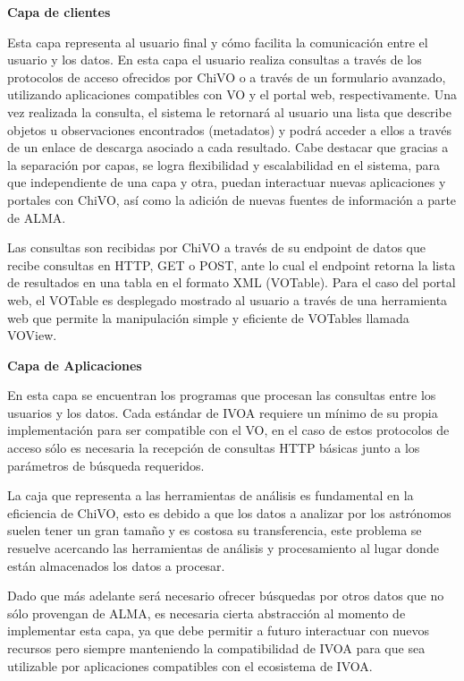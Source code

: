 \textbf{Capa de clientes}

Esta capa representa al usuario final y cómo facilita la comunicación entre el
usuario y los datos.
En esta capa el usuario realiza consultas a través de los protocolos de acceso
ofrecidos por ChiVO o a través de un formulario avanzado, utilizando aplicaciones
compatibles con VO y el portal web, respectivamente.
Una vez realizada la consulta, el sistema le retornará al usuario una lista que
describe objetos u observaciones encontrados (metadatos) y podrá acceder a ellos a
través de un enlace de descarga asociado a cada resultado.
Cabe destacar que gracias a la separación por capas, se logra flexibilidad y
escalabilidad en el sistema, para que independiente de una capa y otra, puedan
interactuar nuevas aplicaciones y portales con ChiVO, así como la adición de nuevas
fuentes de información a parte de ALMA.

Las consultas son recibidas por ChiVO a través de su endpoint de datos que recibe
consultas en HTTP, GET o POST, ante lo cual el endpoint retorna la lista de
resultados en una tabla en el formato XML (VOTable).
Para el caso del portal web, el VOTable es desplegado mostrado al usuario a través
de una herramienta web que permite la manipulación simple y eficiente de VOTables
llamada VOView.

\textbf{Capa de Aplicaciones}

En esta capa se encuentran los programas que procesan las consultas entre los
usuarios y los datos.
Cada estándar de IVOA requiere un mínimo de su propia implementación para ser
compatible con el VO, en el caso de estos protocolos de acceso sólo es necesaria la
recepción de consultas HTTP básicas junto a los parámetros de búsqueda requeridos.

La caja que representa a las herramientas de análisis es fundamental en la
eficiencia de ChiVO, esto es debido a que los datos a analizar por los astrónomos
suelen tener un gran tamaño y es costosa su transferencia, este problema se
resuelve acercando las herramientas de análisis y procesamiento al lugar donde están
almacenados los datos a procesar.

Dado que más adelante será necesario ofrecer búsquedas por otros datos que no sólo
provengan de ALMA, es necesaria cierta abstracción al momento de implementar esta
capa, ya que debe permitir a futuro interactuar con nuevos recursos pero siempre
manteniendo la compatibilidad de IVOA para que sea utilizable por aplicaciones
compatibles con el ecosistema de IVOA.

